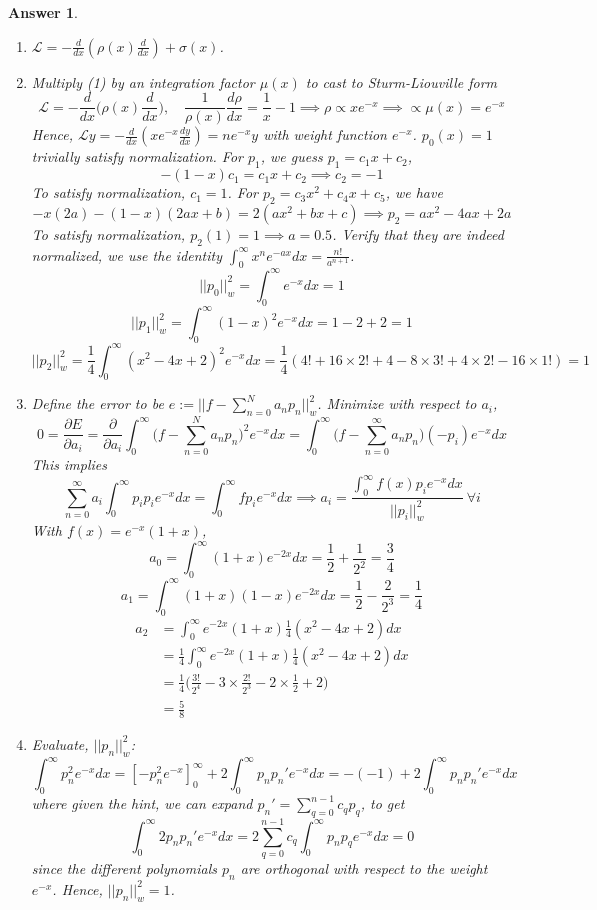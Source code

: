 \documentclass[a4paper]{article}
\newtheorem{ans}{Answer}[section]
\theoremstyle{new}
\begin{document}
\begin{ans}\leavevmode
\begin{enumerate}[label=(\alph*)]
\item $\mathcal{L}=-\frac{d}{dx}(\rho(x)\frac{d}{dx})+\sigma(x)$.
\item Multiply (1) by an integration factor $\mu(x)$ to cast to Sturm-Liouville form 
$$\mathcal{L}=-\frac{d}{dx}\bigg(\rho(x)\frac{d}{dx}\bigg),\quad \frac{1}{\rho(x)}\frac{d\rho}{dx}=\frac{1}{x}-1\implies\rho\propto xe^{-x}\implies\propto\mu(x)=e^{-x}$$
Hence, $\mathcal{L}y=-\frac{d}{dx}(xe^{-x}\frac{dy}{dx})=ne^{-x}y$ with weight function $e^{-x}$. $p_0(x)=1$ trivially satisfy normalization. For $p_1$, we guess $p_1=c_1x+c_2$,
$$-(1-x)c_1=c_1x+c_2\implies c_2=-1$$
To satisfy normalization, $c_1=1$. For $p_2=c_3x^2+c_4x+c_5$, we have
$$-x(2a)-(1-x)(2ax+b)=2(ax^2+bx+c)\implies p_2=ax^2-4ax+2a$$
To satisfy normalization, $p_2(1)=1\implies a=0.5$. Verify that they are indeed normalized, we use the identity $\int_0^\infty x^ne^{-ax}dx=\frac{n!}{a^{n+1}}$.
$$||p_0||_w^2=\int_0^\infty e^{-x}dx=1$$
$$||p_1||_w^2=\int_0^\infty (1-x)^2e^{-x}dx=1-2+2=1$$
$$||p_2||_w^2=\frac{1}{4}\int_0^\infty(x^2-4x+2)^2e^{-x}dx=\frac{1}{4}(4!+16\times 2!+4-8\times 3!+4\times 2!-16\times 1!)=1$$
\item Define the error to be $e:=||f-\sum_{n=0}^Na_np_n||^2_w$. Minimize with respect to $a_i$,
$$0=\frac{\partial E}{\partial a_i}=\frac{\partial}{\partial a_i}\int_0^\infty \bigg(f-\sum_{n=0}^Na_np_n\bigg)^2e^{-x}dx=\int_0^\infty\bigg(f-\sum_{n=0}^\infty a_np_n\bigg)(-p_i)e^{-x}dx$$
This implies $$\sum_{n=0}^\infty a_i\int_0^\infty p_ip_ie^{-x}dx=\int_0^\infty fp_ie^{-x}dx\implies a_i=\frac{\int_0^\infty f(x)p_ie^{-x}dx}{||p_i||^2_w}~\forall i$$ With $f(x)=e^{-x}(1+x)$, $$a_0=\int_0^\infty(1+x)e^{-2x}dx=\frac{1}{2}+\frac{1}{2^2}=\frac{3}{4}$$ $$a_1=\int_0^\infty(1+x)(1-x)e^{-2x}dx=\frac{1}{2}-\frac{2}{2^3}=\frac{1}{4}$$ 
\begin{align}
a_2&=\int_0^\infty e^{-2x}(1+x)\frac{1}{4}(x^2-4x+2)dx\nonumber\\&=\frac{1}{4}\int_0^\infty e^{-2x}(1+x)\frac{1}{4}(x^2-4x+2)dx\nonumber\\&=\frac{1}{4}\bigg(\frac{3!}{2^4}-3\times\frac{2!}{2^3}-2\times\frac{1}{2}+2\bigg)\nonumber\\&=\frac{5}{8}\nonumber
\end{align}
\item Evaluate, $||p_n||^2_w$:
$$\int_0^\infty p_n^2e^{-x}dx=[-p_n^2e^{-x}]_0^\infty +2\int_0^\infty p_np_n'e^{-x}dx=-(-1)+2\int_0^\infty p_np_n'e^{-x}dx$$
where given the hint, we can expand $p_n'=\sum_{q=0}^{n-1}c_qp_q$, to get
$$\int_0^\infty 2p_np_n'e^{-x}dx=2\sum_{q=0}^{n-1}c_q\int_0^\infty p_np_qe^{-x}dx=0$$
since the different polynomials $p_n$ are orthogonal with respect to the weight $e^{-x}$. Hence, $||p_n||^2_w=1$.
\end{enumerate}
\end{ans}
\end{document}
